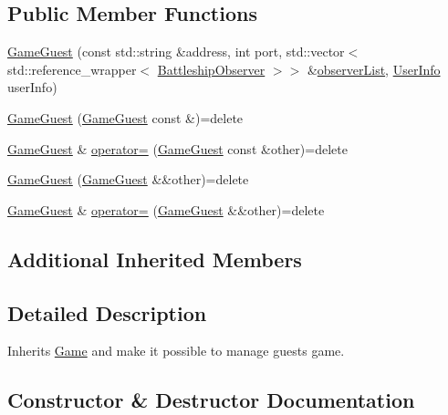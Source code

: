 \subsection*{Public Member Functions}
\begin{DoxyCompactItemize}
\item 
\hyperlink{classMODEL_1_1GameGuest_abd4b62394fc1e7d05395a049d3d4e57e}{Game\+Guest} (const std\+::string \&address, int port, std\+::vector$<$ std\+::reference\+\_\+wrapper$<$ \hyperlink{classBattleshipObserver}{Battleship\+Observer} $>$$>$ \&\hyperlink{classMODEL_1_1Game_afada2cb52f9872db4f3ab6e72d07cd05}{observer\+List}, \hyperlink{classUserInfo}{User\+Info} user\+Info)
\item 
\hyperlink{classMODEL_1_1GameGuest_a6df63e1b2db6ccf936d22495068755cb}{Game\+Guest} (\hyperlink{classMODEL_1_1GameGuest}{Game\+Guest} const \&)=delete
\item 
\hyperlink{classMODEL_1_1GameGuest}{Game\+Guest} \& \hyperlink{classMODEL_1_1GameGuest_ab61c4071b29d9c2c7fee6e919e20af66}{operator=} (\hyperlink{classMODEL_1_1GameGuest}{Game\+Guest} const \&other)=delete
\item 
\hyperlink{classMODEL_1_1GameGuest_a480d2bd3c04c585fa4e20e12394123b1}{Game\+Guest} (\hyperlink{classMODEL_1_1GameGuest}{Game\+Guest} \&\&other)=delete
\item 
\hyperlink{classMODEL_1_1GameGuest}{Game\+Guest} \& \hyperlink{classMODEL_1_1GameGuest_a8e2101bddf0da3dbb56279f2ddeecb5d}{operator=} (\hyperlink{classMODEL_1_1GameGuest}{Game\+Guest} \&\&other)=delete
\end{DoxyCompactItemize}
\subsection*{Additional Inherited Members}


\subsection{Detailed Description}
Inherits \hyperlink{classMODEL_1_1Game}{Game} and make it possible to manage guests game. 

\subsection{Constructor \& Destructor Documentation}
